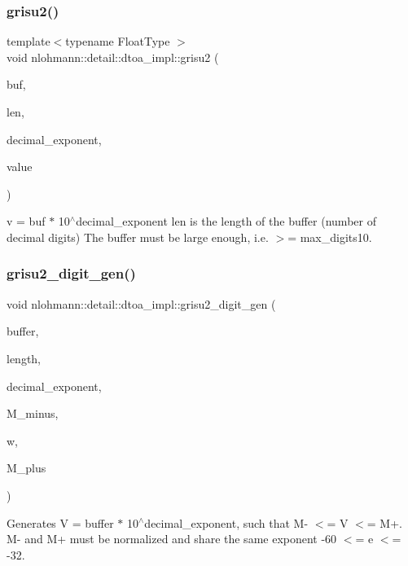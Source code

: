 \subsubsection{\texorpdfstring{grisu2()}{grisu2()}\hspace{0.1cm}{\footnotesize\ttfamily [2/2]}}
{\footnotesize\ttfamily template$<$typename Float\+Type $>$ \\
void nlohmann\+::detail\+::dtoa\+\_\+impl\+::grisu2 (\begin{DoxyParamCaption}\item[{char $\ast$}]{buf,  }\item[{int \&}]{len,  }\item[{int \&}]{decimal\+\_\+exponent,  }\item[{Float\+Type}]{value }\end{DoxyParamCaption})}

v = buf $\ast$ 10$^\wedge$decimal\+\_\+exponent len is the length of the buffer (number of decimal digits) The buffer must be large enough, i.\+e. $>$= max\+\_\+digits10. \mbox{\label{namespacenlohmann_1_1detail_1_1dtoa__impl_a9b899c72b0e1e3dd46d75c2b4e6bcdfb}} 
\subsubsection{\texorpdfstring{grisu2\+\_\+digit\+\_\+gen()}{grisu2\_digit\_gen()}}
{\footnotesize\ttfamily void nlohmann\+::detail\+::dtoa\+\_\+impl\+::grisu2\+\_\+digit\+\_\+gen (\begin{DoxyParamCaption}\item[{char $\ast$}]{buffer,  }\item[{int \&}]{length,  }\item[{int \&}]{decimal\+\_\+exponent,  }\item[{\mbox{\hyperlink{structnlohmann_1_1detail_1_1dtoa__impl_1_1diyfp}{diyfp}}}]{M\+\_\+minus,  }\item[{\mbox{\hyperlink{structnlohmann_1_1detail_1_1dtoa__impl_1_1diyfp}{diyfp}}}]{w,  }\item[{\mbox{\hyperlink{structnlohmann_1_1detail_1_1dtoa__impl_1_1diyfp}{diyfp}}}]{M\+\_\+plus }\end{DoxyParamCaption})\hspace{0.3cm}{\ttfamily [inline]}}

Generates V = buffer $\ast$ 10$^\wedge$decimal\+\_\+exponent, such that M-\/ $<$= V $<$= M+. M-\/ and M+ must be normalized and share the same exponent -\/60 $<$= e $<$= -\/32. 